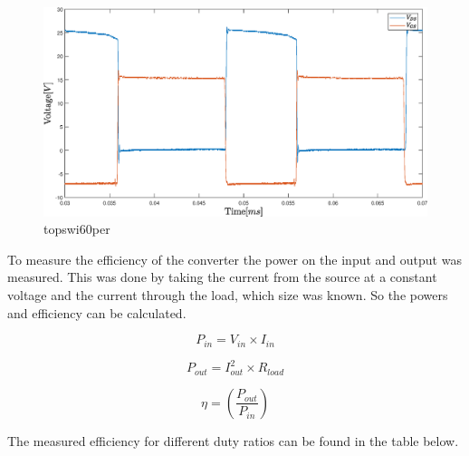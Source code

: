 \begin{figure}[H]
	\begin{center}
   \includegraphics[width=\textwidth]{figures/06Testing/topswi60per.eps}
	\end{center}
	\vspace{-8mm}
	\caption{topswi60per}
	\label{fig:V_OUT_ALL}
\end{figure}

To measure the efficiency of the converter the power on the input and output was measured.
This was done by taking the current from the source at a constant voltage and the current through the load, which size was known. So the powers and efficiency can be calculated.

\begin{equation}
	P_{in}= V_{in} \times I_{in}
	\label{eq:EfficiencyPin}
\end{equation}

\begin{equation}
	P_{out}= I_{out}^2 \times R_{load}
	\label{eq:EfficiencyPout}
\end{equation}

\begin{equation}
	\eta = (\frac{P_{out}}{P_{in}})
	\label{eq:Efficiency}
\end{equation}


The measured efficiency for different duty ratios can be found in the table below.

